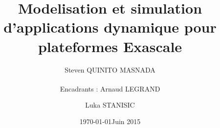 \documentclass[smallextended]{svjour3}
\date{\today}
\title{}
\begin{document}
\newcommand{\AL}[2][inline]{\todo[color=green!50,#1]{\sf \textbf{AL:} #2}\xspace}
\newcommand{\LS}[2][inline]{\todo[color=green!50,#1]{\sf \textbf{LS:} #2}\xspace}

\let\oldcite=\cite
\renewcommand\cite[2][]{~\ifthenelse{\equal{#1}{}}{\oldcite{#2}}{\oldcite[#1]{#2}}\xspace}
\let\oldref=\ref
\def\ref#1{~\oldref{#1}\xspace}
\def\ie{i.e.,\xspace}
\def\eg{e.g.,\xspace}
\def\qrmspu{\texttt{QRM\_StarPU}\xspace}
\sloppy

\title{Modelisation et simulation d'applications dynamique pour plateformes Exascale%
}


\author{Steven QUINITO MASNADA  \\ \\
        Encadrants : Arnaud LEGRAND \and Luka STANISIC  %
}



\date{Juin 2015}

\maketitle
\end{document}
